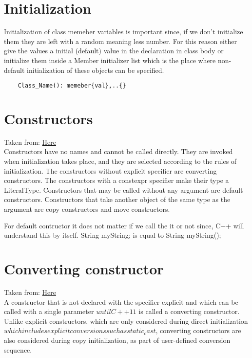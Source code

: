 \documentclass[11pt,twoside,a4paper]{report}
\begin{document}
\section{Initialization}
Initialization of class memeber variables is important since, if we don't initialize them they are left with a random meaning less number. For this reason either give the values a initial (default) value in the declaration in class body
or initialize them inside a Member initializer list which is the place where non-default initialization of these objects can be specified.
\begin{lstlisting}
    Class_Name(): memeber{val},..{}
\end{lstlisting}


\section{Constructors}
Taken from: \href{https://en.cppreference.com/w/cpp/language/constructor}{Here} \\
Constructors have no names and cannot be called directly. They are invoked when initialization takes place, and they are selected according to 
the rules of initialization. The constructors without explicit specifier are converting constructors. The constructors with a constexpr specifier 
make their type a LiteralType. Constructors that may be called without any argument are default constructors. Constructors that take another object of the same type as the argument are copy constructors and move constructors. 

For default contructor it does not matter if we call the it or not since, C++ will understand this by itself.
String myString; is equal to String myString();

\section{Converting constructor}
Taken from: \href{https://en.cppreference.com/w/cpp/language/converting_constructor}{Here} \\
A constructor that is not declared with the specifier explicit and which can be called with a single parameter \(until C++11\) is called a converting constructor.
Unlike explicit constructors, which are only considered during direct initialization \(which includes explicit conversions such as static_cast\), converting constructors are also considered during copy initialization, as part of user-defined conversion sequence. 
\end{document}
